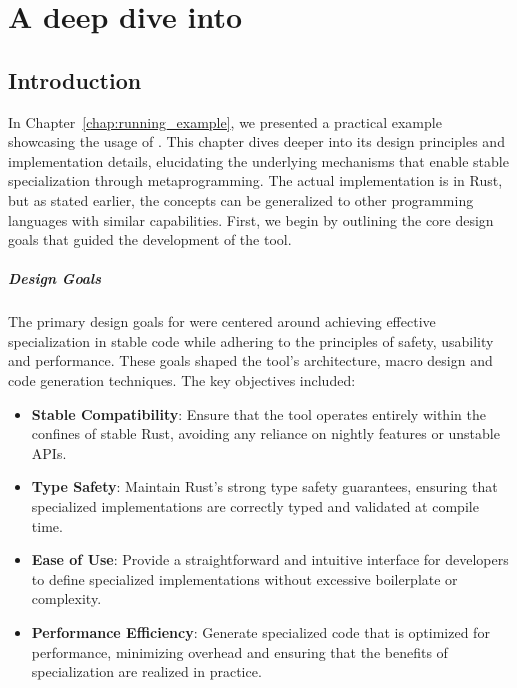 \chapter{A deep dive into \mytool}\label{chap:approach}


\section{Introduction}\label{sec:approach-introduction}
In Chapter~\ref{chap:running_example}, we presented a practical example showcasing the usage of \mytool{}.
This chapter dives deeper into its design principles and implementation details, elucidating the underlying mechanisms that enable stable specialization through metaprogramming.
The actual implementation is in Rust, but as stated earlier, the concepts can be generalized to other programming languages with similar capabilities.
First, we begin by outlining the core design goals that guided the development of the tool.

\paragraph{Design Goals}
The primary design goals for \mytool{} were centered around achieving effective specialization in stable code while adhering to the principles of safety, usability and performance.
These goals shaped the tool's architecture, macro design and code generation techniques.
The key objectives included:
\begin{itemize}
	\item \textbf{Stable Compatibility}: Ensure that the tool operates entirely within the confines of stable Rust, avoiding any reliance on nightly features or unstable APIs.
	\item \textbf{Type Safety}: Maintain Rust's strong type safety guarantees, ensuring that specialized implementations are correctly typed and validated at compile time.
	\item \textbf{Ease of Use}: Provide a straightforward and intuitive interface for developers to define specialized implementations without excessive boilerplate or complexity.
	\item \textbf{Performance Efficiency}: Generate specialized code that is optimized for performance, minimizing overhead and ensuring that the benefits of specialization are realized in practice.
\end{itemize}

